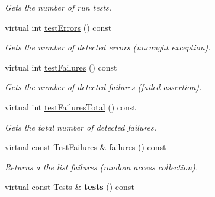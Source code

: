 \begin{DoxyCompactItemize}
\begin{DoxyCompactList}\small\item\em Gets the number of run tests. \end{DoxyCompactList}\item 
\hypertarget{class_test_result_collector_a8c5f204022975944832789606f2c657b}{virtual int \hyperlink{class_test_result_collector_a8c5f204022975944832789606f2c657b}{test\+Errors} () const }\label{class_test_result_collector_a8c5f204022975944832789606f2c657b}

\begin{DoxyCompactList}\small\item\em Gets the number of detected errors (uncaught exception). \end{DoxyCompactList}\item 
\hypertarget{class_test_result_collector_afdd272f678edd078b7fd2699f831a243}{virtual int \hyperlink{class_test_result_collector_afdd272f678edd078b7fd2699f831a243}{test\+Failures} () const }\label{class_test_result_collector_afdd272f678edd078b7fd2699f831a243}

\begin{DoxyCompactList}\small\item\em Gets the number of detected failures (failed assertion). \end{DoxyCompactList}\item 
\hypertarget{class_test_result_collector_af2f843ad7cafcfa383f2f86d222fa2f4}{virtual int \hyperlink{class_test_result_collector_af2f843ad7cafcfa383f2f86d222fa2f4}{test\+Failures\+Total} () const }\label{class_test_result_collector_af2f843ad7cafcfa383f2f86d222fa2f4}

\begin{DoxyCompactList}\small\item\em Gets the total number of detected failures. \end{DoxyCompactList}\item 
\hypertarget{class_test_result_collector_a7a5eb5d36914e62b57b96be71035b98e}{virtual const Test\+Failures \& \hyperlink{class_test_result_collector_a7a5eb5d36914e62b57b96be71035b98e}{failures} () const }\label{class_test_result_collector_a7a5eb5d36914e62b57b96be71035b98e}

\begin{DoxyCompactList}\small\item\em Returns a the list failures (random access collection). \end{DoxyCompactList}\item 
\hypertarget{class_test_result_collector_a93ab31ee41908f363b734e751df12510}{virtual const Tests \& {\bfseries tests} () const }\label{class_test_result_collector_a93ab31ee41908f363b734e751df12510}


\end{DoxyCompactItemize}
